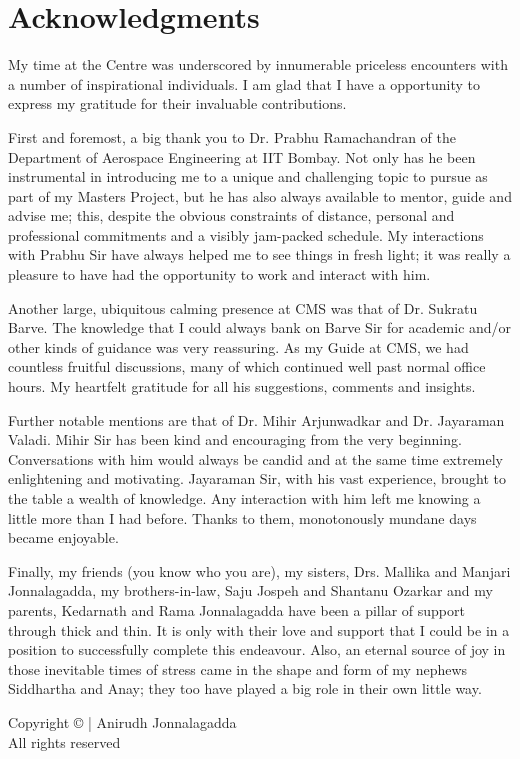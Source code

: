 \chapter*{Acknowledgments}

My time at the Centre was underscored by innumerable priceless encounters with a number of inspirational individuals. I am glad that I have a opportunity to express my gratitude for their invaluable contributions.

First and foremost, a big thank you to Dr. Prabhu Ramachandran of the Department of Aerospace Engineering at IIT Bombay. Not only has he been instrumental in introducing me to a unique and challenging topic to pursue as part of my Masters Project, but he has also always available to mentor, guide and advise me; this, despite the obvious constraints of distance, personal and professional commitments and a visibly jam-packed schedule. My interactions with Prabhu Sir have always helped me to see things in fresh light; it was really a pleasure to have had the opportunity to work and interact with him.

Another large, ubiquitous calming presence at CMS was that of Dr. Sukratu Barve. The knowledge that I could always bank on Barve Sir for academic and/or other kinds of guidance was very reassuring. As my Guide at CMS, we had countless fruitful discussions, many of which continued well past normal office hours. My heartfelt gratitude for all his suggestions, comments and insights.

Further notable mentions are that of Dr. Mihir Arjunwadkar and Dr. Jayaraman Valadi. Mihir Sir has been kind and encouraging from the very beginning. Conversations with him would always be candid and at the same time extremely enlightening and motivating. Jayaraman Sir, with his vast experience, brought to the table a wealth of knowledge. Any interaction with him left me knowing a little more than I had before. Thanks to them, monotonously mundane days became enjoyable.

Finally, my friends (you know who you are), my sisters, Drs. Mallika and Manjari Jonnalagadda, my brothers-in-law, Saju Jospeh and Shantanu Ozarkar and my parents, Kedarnath and Rama Jonnalagadda have been a pillar of support through thick and thin. It is only with their love and support that I could be in a position to successfully complete this endeavour. Also, an eternal source of joy in those inevitable times of stress came in the shape and form of my nephews Siddhartha and Anay; they too have played a big role in their own little way.

\vfill
\noindent
{\large{Copyright \copyright {} | Anirudh Jonnalagadda\\All rights reserved}}
